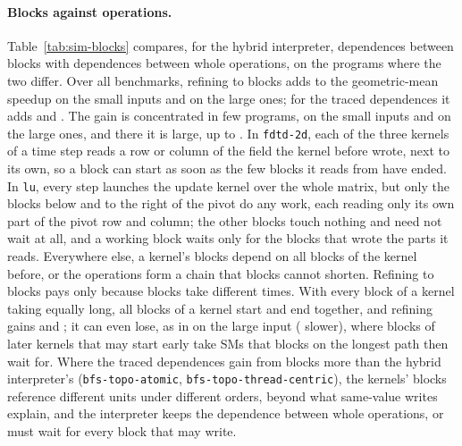 \documentclass[11pt]{article}
\newcommand{\tabref}[1]{Table~\ref{#1}}
\newcommand{\code}[1]{\texttt{#1}}
\begin{document}
\paragraph{Blocks against operations.} \tabref{tab:sim-blocks} compares, for the hybrid interpreter,
dependences between blocks with dependences between whole operations, on the programs where the two differ. Over
all benchmarks, refining to blocks adds \numSimSmallBlkGain{} to the geometric-mean speedup on the small inputs
and \numSimLargeBlkGain{} on the large ones; for the traced dependences it adds \numSimSmallTrBlkGain{} and
\numSimLargeTrBlkGain{}. The gain is concentrated in few programs, \numSimSmallBlkProgs{} on the small inputs and
\numSimLargeBlkProgs{} on the large ones, and there it is large, up to \numSimSmallBlkMax{}. In \code{fdtd-2d},
each of the three kernels of a time step reads a row or column of the field the kernel before wrote, next to its
own, so a block can start as soon as the few blocks it reads from have ended. In \code{lu}, every step launches
the update kernel over the whole matrix, but only the blocks below and to the right of the pivot do any work, each
reading only its own part of the pivot row and column; the other blocks touch nothing and need not wait at all,
and a working block waits only for the blocks that wrote the parts it reads. Everywhere else, a kernel's blocks
depend on all blocks of the kernel before, or the operations form a chain that blocks cannot shorten. Refining to
blocks pays only because blocks take different times. With every block of a kernel taking equally long, all blocks
of a kernel start and end together, and refining gains \numSimSmallEqBlkGain{} and \numSimLargeEqBlkGain{}; it can
even lose, as in \code{\numSimLargeEqWorstName{}} on the large input (\numSimLargeEqWorst{} slower), where blocks of
later kernels that may start early take SMs that blocks on the longest path then wait for. Where the traced
dependences gain from blocks more than the hybrid interpreter's (\code{bfs-topo-atomic}, \code{bfs-topo-thread-centric}),
the kernels' blocks reference different units under different orders, beyond what same-value writes explain, and
the interpreter keeps the dependence between whole operations, or must wait for every block that may write.

\begin{table}[tbp]
\centering
\footnotesize
\setlength{\tabcolsep}{4pt}

\caption{Speedup over issuing in order on the simulated A30 with the hybrid interpreter's dependences between
whole operations and between blocks, the gain of the second over the first, and the traced dependences between
blocks, for the programs where refining to blocks changes the speedup by more than half a percent.}
\label{tab:sim-blocks}
\end{table}
\end{document}
